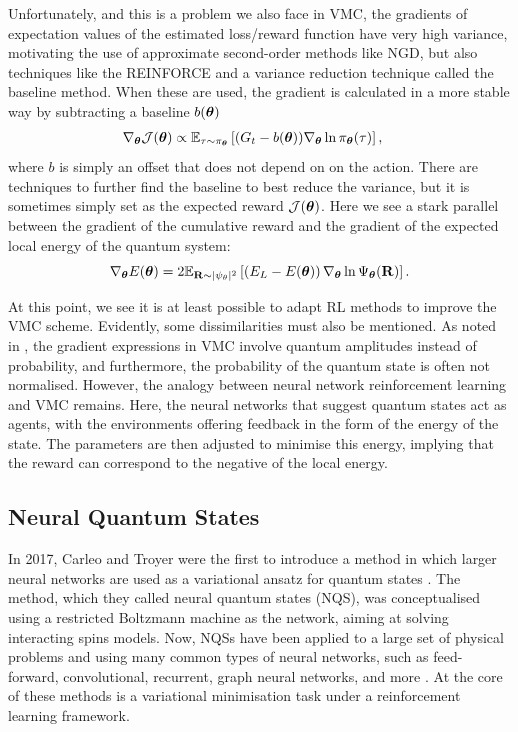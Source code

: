 Unfortunately, and this is a problem we also face in VMC, the gradients of expectation values of the estimated loss/reward function have very high variance, motivating the use of approximate second-order methods like NGD, but also techniques like the REINFORCE \cite{williams1992simple} and a variance reduction technique called the baseline method. When these are used, the gradient is calculated in a more stable way \cite{dlbook} by subtracting a baseline $b({\boldsymbol{\theta}})$
\begin{align*}
    \nabla_{\boldsymbol{\theta}} \mathcal{J}(\boldsymbol{\theta})&\propto \mathbb{E}_{\tau \sim \pi_{\boldsymbol{\theta}}} \left[(G_t - b(\boldsymbol{\theta}))\nabla_{\boldsymbol{\theta}} \ln \pi_{\boldsymbol{\theta}}(\tau) \right],
\end{align*}
where $b$ is simply an offset that does not depend on on the action. There are techniques to further find the baseline to best reduce the variance, but it is sometimes simply set as the expected reward $\mathcal{J}(\boldsymbol{\theta})$. Here we see a stark parallel between the gradient of the cumulative reward and the gradient of the expected local energy of the quantum system:
\begin{equation*}
    \nabla_{\boldsymbol{\theta}} E(\boldsymbol{\theta})=2 \mathbb{E}_{\mathbf{R}\sim |\psi_\theta|^2}\left[ \left(E_L
- E(\boldsymbol{\theta})\right)\nabla_{\boldsymbol{\theta}}\ln \Psi_{\boldsymbol{\theta}} (\mathbf{R})\right].
\label{eq:grad_el_vmc}
\end{equation*}

At this point, we see it is at least possible to adapt RL methods to improve the VMC scheme. Evidently, some dissimilarities must also be mentioned. As noted in \cite{sheng}, the gradient expressions in VMC involve quantum amplitudes instead of probability, and furthermore, the probability of the quantum state is often not normalised. However, the analogy between neural network reinforcement learning and VMC remains. Here, the neural networks that suggest quantum states act as agents, with the environments offering feedback in the form of the energy of the state. The parameters are then adjusted to minimise this energy, implying that the reward can correspond to the negative of the local energy.

\subsection{Neural Quantum States}\label{sec:NQS}

In 2017, Carleo and Troyer were the first to introduce a method in which larger neural networks are used as a variational ansatz for quantum states \cite{carleo2017solving}. The method, which they called neural quantum states (NQS), was conceptualised using a restricted Boltzmann machine as the network, aiming at solving interacting spins models. Now, NQSs have been applied to a large set of physical problems and using many common types of neural networks, such as feed-forward, convolutional, recurrent, graph neural networks, and more \cite{lange2024architectures}. At the core of these methods is a variational minimisation task under a reinforcement learning framework.

